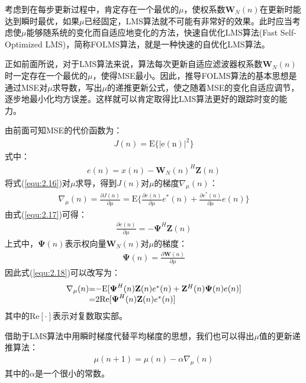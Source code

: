 考虑到在每步更新过程中，肯定存在一个最优的$\mu$，使权系数$\mathbf{W}_N(n)$在更新时能达到瞬时最优，如果$\mu$已经固定，LMS算法就不可能有非常好的效果。此时应当考虑使$\mu$能够随系统的变化而自适应地变化的方法，快速自优化LMS算法(Fast
Self-Optimized
LMS)，简称FOLMS算法，就是一种快速的自优化LMS算法\citep{Bragard1990,George1999,Benveniste1990}。

正如前面所说，对于LMS算法来说，算法每次更新自适应滤波器权系数$\mathbf{W}_N(n)$时一定存在一个最优的$\mu$，使得MSE最小。因此，推导FOLMS算法的基本思想是通过MSE对$\mu$求导数，写出$\mu$的递推更新公式，使之随着MSE的变化自适应调节，逐步地最小化均方误差。这样就可以肯定取得比LMS算法更好的跟踪时变的能力。

由前面可知MSE的代价函数为：
\begin{eqnarray}
    J(n)=\mathrm{E\{|e(n)|^2\}}
    \label{equ:2.16}
\end{eqnarray}
式中：
\begin{eqnarray}
    e(n)=x(n)-\mathbf{W}_N(n)^H\mathbf{Z}(n)
    \label{equ:2.17}
\end{eqnarray}
将式(\ref{equ:2.16})对$\mu$求导，得到$J(n)$对$\mu$的梯度$\nabla_{\mu}(n)$：
\begin{eqnarray}
    \nabla_{\mu}(n)=\frac{\partial J(n)}{\partial
    \mu}=\mathrm{E}\{\frac{\partial e(n)}{\partial
    \mu}e^*(n)+\frac{\partial e^*(n)}{\partial \mu}e(n)\}
    \label{equ:2.18}
\end{eqnarray}
由式(\ref{equ:2.17})可得：
\begin{eqnarray}
    \frac{\partial e(n)}{\partial \mu}=-\boldsymbol{\Psi}^H\mathbf{Z}(n)
    \label{equ:2.19}
\end{eqnarray}
上式中，$\boldsymbol{\Psi}(n)$表示权向量$\mathbf{W}_N(n)$对$\mu$的梯度：
\begin{eqnarray}
    \boldsymbol{\Psi}(n)=\frac{\partial\mathbf{W}(n)}{\partial\mu}
    \label{equ:2.20}
\end{eqnarray}
因此式(\ref{equ:2.18})可以改写为：
\begin{eqnarray}
    \begin{array}{l@{\mbox{=}}l}
        \nabla_{\mu}(n)&-\mathrm{E}[\boldsymbol{\Psi}^H(n)\mathbf{Z}(n)e^*(n)+\mathbf{Z}^H(n)\boldsymbol{\Psi}(n)e(n)]\\
        &2\mathrm{Re}[\boldsymbol{\Psi}^H(n)\mathbf{Z}(n)e^*(n)]
    \end{array}
    \label{equ:2.21}
\end{eqnarray}
其中的$\mathrm{Re}[\cdot]$表示对复数取实部。

借助于LMS算法中用瞬时梯度代替平均梯度的思想，我们也可以得出$\mu$值的更新递推算法：
\begin{eqnarray}
    \mu(n+1)=\mu(n)-\alpha\nabla_{\mu}(n)
    \label{equ:2.22}
\end{eqnarray}
其中的$\alpha$是一个很小的常数。

